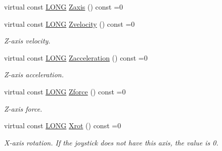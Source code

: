 \begin{DoxyCompactItemize}
virtual const \hyperlink{_joypad_8h_a2a3e0cda5f1249bef6db47c5eb8e3813}{L\+O\+NG} \hyperlink{struct_x_input_joypad_af4bfca4d8f22808a92a0ae26468cdedc}{Zaxis} () const =0
\item 
\mbox{\label{struct_x_input_joypad_a324d7b6c76e29d4dec9f1ecfbf771243}} 
virtual const \hyperlink{_joypad_8h_a2a3e0cda5f1249bef6db47c5eb8e3813}{L\+O\+NG} \hyperlink{struct_x_input_joypad_a324d7b6c76e29d4dec9f1ecfbf771243}{Zvelocity} () const =0
\begin{DoxyCompactList}\small\item\em Z-\/axis velocity. \end{DoxyCompactList}\item 
\mbox{\label{struct_x_input_joypad_ac6f8ddb5e87a0c30e6c454f1f2ff506b}} 
virtual const \hyperlink{_joypad_8h_a2a3e0cda5f1249bef6db47c5eb8e3813}{L\+O\+NG} \hyperlink{struct_x_input_joypad_ac6f8ddb5e87a0c30e6c454f1f2ff506b}{Zacceleration} () const =0
\begin{DoxyCompactList}\small\item\em Z-\/axis acceleration. \end{DoxyCompactList}\item 
\mbox{\label{struct_x_input_joypad_ad27b9f26025b9c2a5ffc7c12ec230d18}} 
virtual const \hyperlink{_joypad_8h_a2a3e0cda5f1249bef6db47c5eb8e3813}{L\+O\+NG} \hyperlink{struct_x_input_joypad_ad27b9f26025b9c2a5ffc7c12ec230d18}{Zforce} () const =0
\begin{DoxyCompactList}\small\item\em Z-\/axis force. \end{DoxyCompactList}\item 
\mbox{\label{struct_x_input_joypad_a7142a1f6548cc59553846ca7e9889ef6}} 
virtual const \hyperlink{_joypad_8h_a2a3e0cda5f1249bef6db47c5eb8e3813}{L\+O\+NG} \hyperlink{struct_x_input_joypad_a7142a1f6548cc59553846ca7e9889ef6}{Xrot} () const =0
\begin{DoxyCompactList}\small\item\em X-\/axis rotation. If the joystick does not have this axis, the value is 0. \end{DoxyCompactList}\item 
\mbox{\label{struct_x_input_joypad_ad6bcc1e11d6acbd06ebf5829be849eed}} 

\end{DoxyCompactItemize}
